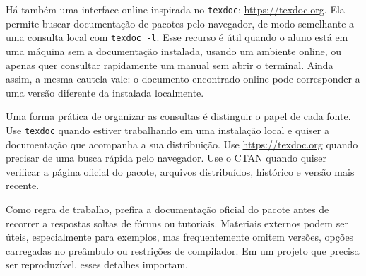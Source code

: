 Há também uma interface online inspirada no \texttt{texdoc}: \url{https://texdoc.org}. Ela permite buscar documentação de pacotes pelo navegador, de modo semelhante a uma consulta local com \texttt{texdoc -l}. Esse recurso é útil quando o aluno está em uma máquina sem a documentação instalada, usando um ambiente online, ou apenas quer consultar rapidamente um manual sem abrir o terminal. Ainda assim, a mesma cautela vale: o documento encontrado online pode corresponder a uma versão diferente da instalada localmente.

Uma forma prática de organizar as consultas é distinguir o papel de cada fonte. Use \texttt{texdoc} quando estiver trabalhando em uma instalação local e quiser a documentação que acompanha a sua distribuição. Use \url{https://texdoc.org} quando precisar de uma busca rápida pelo navegador. Use o CTAN quando quiser verificar a página oficial do pacote, arquivos distribuídos, histórico e versão mais recente.

Como regra de trabalho, prefira a documentação oficial do pacote antes de recorrer a respostas soltas de fóruns ou tutoriais. Materiais externos podem ser úteis, especialmente para exemplos, mas frequentemente omitem versões, opções carregadas no preâmbulo ou restrições de compilador. Em um projeto que precisa ser reproduzível, esses detalhes importam.
